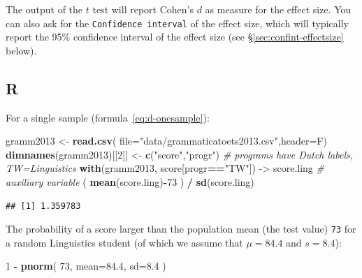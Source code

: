 \documentclass[
]{book}
\newenvironment{Shaded}{\begin{snugshade}}{\end{snugshade}}
\newcommand{\CommentTok}[1]{\textcolor[rgb]{0.56,0.35,0.01}{\textit{#1}}}
\newcommand{\DataTypeTok}[1]{\textcolor[rgb]{0.13,0.29,0.53}{#1}}
\newcommand{\DecValTok}[1]{\textcolor[rgb]{0.00,0.00,0.81}{#1}}
\newcommand{\FloatTok}[1]{\textcolor[rgb]{0.00,0.00,0.81}{#1}}
\newcommand{\KeywordTok}[1]{\textcolor[rgb]{0.13,0.29,0.53}{\textbf{#1}}}
\newcommand{\NormalTok}[1]{#1}
\newcommand{\OperatorTok}[1]{\textcolor[rgb]{0.81,0.36,0.00}{\textbf{#1}}}
\newcommand{\StringTok}[1]{\textcolor[rgb]{0.31,0.60,0.02}{#1}}
\begin{document}
The output of the \(t\) test will report Cohen's \(d\) as measure for the effect size. You can also ask for the \texttt{Confidence\ interval} of the effect size, which will typically report the 95\% confidence interval of the effect size (see §\ref{sec:confint-effectsize} below).

\hypertarget{r-13}{%
\subsection{R}\label{r-13}}

For a single sample
(formula~\eqref{eq:d-onesample}):\\

\begin{Shaded}
\begin{Highlighting}[]
\NormalTok{gramm2013 \textless{}{-}}\StringTok{ }\KeywordTok{read.csv}\NormalTok{( }\DataTypeTok{file=}\StringTok{"data/grammaticatoets2013.csv"}\NormalTok{,}\DataTypeTok{header=}\NormalTok{F)}
\KeywordTok{dimnames}\NormalTok{(gramm2013)[[}\DecValTok{2}\NormalTok{]] \textless{}{-}}\StringTok{ }\KeywordTok{c}\NormalTok{(}\StringTok{"score"}\NormalTok{,}\StringTok{"progr"}\NormalTok{)}
\CommentTok{\# programs have Dutch labels, TW=Linguistics}
\KeywordTok{with}\NormalTok{(gramm2013, score[progr}\OperatorTok{==}\StringTok{"TW"}\NormalTok{]) {-}\textgreater{}}\StringTok{ }\NormalTok{score.ling}
\CommentTok{\# auxiliary variable}
\NormalTok{( }\KeywordTok{mean}\NormalTok{(score.ling)}\OperatorTok{{-}}\DecValTok{73}\NormalTok{ ) }\OperatorTok{/}\StringTok{ }\KeywordTok{sd}\NormalTok{(score.ling) }
\end{Highlighting}
\end{Shaded}

\begin{verbatim}
## [1] 1.359783
\end{verbatim}

The probability of a score larger than the population mean (the test value) \texttt{73} for a random Linguistics
student (of which we assume that \(\mu=84.4\) and \(s=8.4\)):

\begin{Shaded}
\begin{Highlighting}[]
\DecValTok{1} \OperatorTok{{-}}\StringTok{ }\KeywordTok{pnorm}\NormalTok{( }\DecValTok{73}\NormalTok{, }\DataTypeTok{mean=}\FloatTok{84.4}\NormalTok{, }\DataTypeTok{sd=}\FloatTok{8.4}\NormalTok{ ) }
\end{Highlighting}
\end{Shaded}
\end{document}
